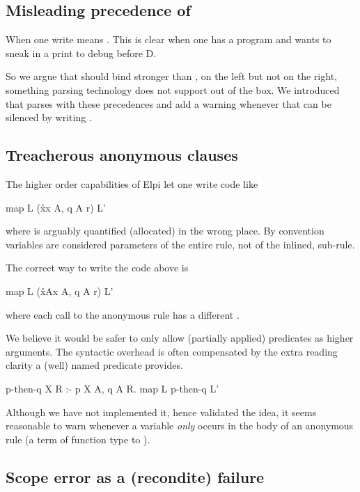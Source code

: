 \documentclass[a4paper, 11pt]{book}
\begin{document}
\subsection{Misleading precedence of \elpi{=>}}

When one write  means
. This is clear when
one has a program  and wants
to sneak in a print to debug before D.

So we argue that \elpi{=>} should bind stronger than ,
on the left but not on the right, something parsing
technology does not support out of the box. We introduced
\elpi{==>} that parses with these precedences and add a warning
whenever  that can be silenced
by writing .

\subsection{Treacherous anonymous clauses}

The higher order capabilities of Elpi let one write
code like
\begin{elpicode}
map L (x\r\p x A, q A r) L'
\end{elpicode}
where  is arguably quantified (allocated) in the
wrong place. By convention variables are considered parameters
of the entire rule, not of the inlined, sub-rule.

The correct way to write the code above is
\begin{elpicode}
map L (x\r\sigma A\p x A, q A r) L'
\end{elpicode}
where each
call to the anonymous rule has a different .

We believe it would be safer to only allow (partially
applied) predicates as higher arguments.
The syntactic overhead is often compensated by the extra
reading clarity a (well) named predicate provides.

\begin{elpicode}
p-then-q X R :- p X A, q A R.
map L p-then-q L'
\end{elpicode}  

Although we have not implemented it, hence validated the idea,
it seems reasonable to warn whenever a variable \emph{only} occurs
in the body of an anonymous rule (a term of function type to ).

\subsection{Scope error as a (recondite) failure}
\end{document}
